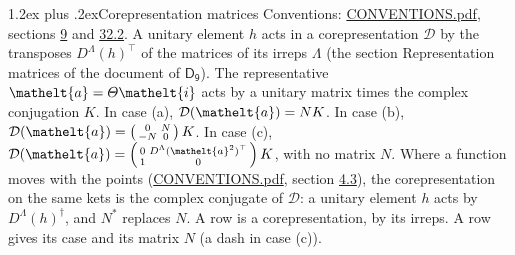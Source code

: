 \documentclass[10pt,a4paper]{article}
\makeatletter
\renewcommand\section{\@startsection{section}{1}{\z@}{-3ex plus -1ex minus -.2ex}%
  {1.2ex plus .2ex}{\normalfont\large\sffamily\bfseries\color{parttitle}}}
\numberwithin{equation}{section}
\newcommand{\eltfont}[1]{{\let\sigma\eltsigma\mathelt{#1}}}
\newcommand{\grp}[1]{\mathsf{#1}}
\newcommand{\elt}[1]{\eltfont{#1}}
\makeatother
\begin{document}
\section{Corepresentation matrices}\label{s:corep_matrices}
Conventions: \href{../../CONVENTIONS.pdf}{CONVENTIONS.pdf}, sections \href{../../../rotation/CONVENTIONS.pdf\#conv.9}{9} and \href{../../CONVENTIONS.pdf\#conv.32.2}{32.2}.
A unitary element $h$ acts in a corepresentation $\mathcal{D}$ by the transposes $D^{\Lambda}(h)^{\top}$ of the matrices of its irreps $\Lambda$ (the section Representation matrices of the document of \href{../../../rotation/data/pdf/D9.pdf}{$\grp{D_{9}}$}). The representative $\elt{a} = \varTheta\elt{i}$ acts by a unitary matrix times the complex conjugation $K$.
In case (a), $\mathcal{D}(\elt{a}) = NK$. In case (b), $\mathcal{D}(\elt{a}) = \left(\begin{smallmatrix} 0 & N \\ -N & 0 \end{smallmatrix}\right) K$. In case (c), $\mathcal{D}(\elt{a}) = \left(\begin{smallmatrix} 0 & D^{\Lambda}(\elt{a}^2)^{\top} \\ 1 & 0 \end{smallmatrix}\right) K$, with no matrix $N$.
Where a function moves with the points (\href{../../CONVENTIONS.pdf}{CONVENTIONS.pdf}, section \href{../../../rotation/CONVENTIONS.pdf\#conv.4.3}{4.3}), the corepresentation on the same kets is the complex conjugate of $\mathcal{D}$: a unitary element $h$ acts by $D^{\Lambda}(h)^{\dagger}$, and $N^{*}$ replaces $N$.
A row is a corepresentation, by its irreps. A row gives its case and its matrix $N$ (a dash in case (c)).
\end{document}
